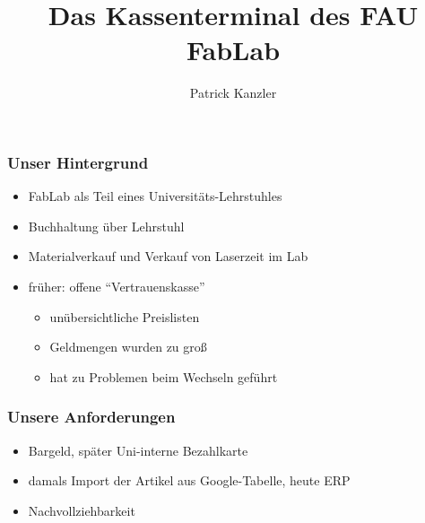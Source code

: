 \documentclass[german]{beamer} %
\title{Das Kassenterminal des FAU FabLab}
\author{Patrick Kanzler}
\begin{document}

\maketitle


\frame{\tableofcontents}


\begin{frame}
\frametitle{Unser Hintergrund}
\begin{itemize}
 \item FabLab als Teil eines Universitäts-Lehrstuhles
 \item Buchhaltung über Lehrstuhl
 \item Materialverkauf und Verkauf von Laserzeit im Lab
 \item früher: offene \enquote{Vertrauenskasse}
   \begin{itemize}
   	\item unübersichtliche Preislisten
   	\item Geldmengen wurden zu groß
    \item hat zu Problemen beim Wechseln geführt
   \end{itemize} 	
\end{itemize}	 
\end{frame}

\begin{frame}
\frametitle{Unsere Anforderungen}
 \begin{itemize}
 	\item Bargeld, später Uni-interne Bezahlkarte
 	\item damals Import der Artikel aus Google-Tabelle, heute ERP
	\item Nachvollziehbarkeit
 \end{itemize}
\end{frame}
\end{document}

